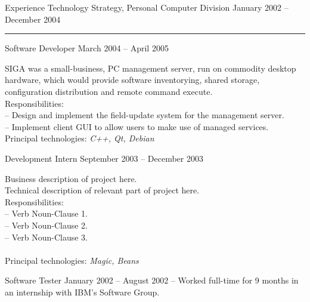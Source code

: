 \documentclass[letterpaper, 11pt]{article}
\begin{document}
\begin{resume}
\begin{category}{Experience}
                     {Technology Strategy, Personal Computer Division} {January 2002 -- December 2004}
            \rule{\textwidth}{1pt}
            \begin{block}
                 {Software Developer}
                         { }                                 {March 2004 -- April 2005}
                \par
                SIGA was a small-business, PC management server, run on commodity desktop
                hardware, which would provide software inventorying, shared storage,
                configuration distribution and remote command execute.
                \\[1ex]
                Responsibilities: \\
                -- Design and implement the field-update system for the management server. \\
                -- Implement client GUI to allow users to make use of managed services.
                \\[1ex]
                Principal technologies: \emph{ C++, Qt, Debian }
            \end{block}
            \begin{block}
                 {Development Intern}
                         { }                           {September 2003 -- December 2003}
                \par
                Business description of project here.
                \\[1ex]
                Technical description of relevant part of project here.
                \\[1ex]
                Responsibilities: \\
                -- Verb Noun-Clause 1. \\
                -- Verb Noun-Clause 2. \\
                -- Verb Noun-Clause 3. \\
                \\[1ex]
                Principal technologies: \emph{ Magic, Beans }
            \end{block}
            \begin{block}
                 {Software Tester}
                         { }                {January 2002 -- August 2002}
                -- Worked full-time for 9 months in an internship with IBM's Software Group.            \\

\end{block}
\end{category}
\end{resume}
\end{document}
